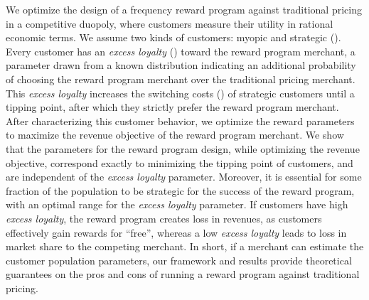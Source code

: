 We optimize the design of a frequency reward program against traditional pricing in a competitive duopoly, where customers measure their utility in rational economic terms.
We assume two kinds of customers: myopic and strategic (\cite{yilmaz2016upgrade}). 
Every customer has an \emph{excess loyalty} (\cite{fader1993excess}) toward the reward program merchant, a parameter drawn from a known distribution indicating an additional probability of choosing the reward program merchant over the traditional pricing merchant.
This \emph{excess loyalty} increases the switching costs (\cite{klemperer1995competition}) of strategic customers until a tipping point, after which they strictly prefer the reward program merchant. 
After characterizing this customer behavior, we optimize the reward parameters to maximize the revenue objective of the reward program merchant.
We show that the parameters for the reward program design, while optimizing the revenue objective, correspond exactly to minimizing the tipping point of customers, and are independent of the \emph{excess loyalty} parameter.
Moreover, it is essential for some fraction of the population to be strategic for the success of the reward program, with an optimal range for the \emph{excess loyalty} parameter. 
If customers have high \emph{excess loyalty}, the reward program creates loss in revenues, as customers effectively gain rewards for ``free'', whereas a low \emph{excess loyalty} leads to loss in market share to the competing merchant.
In short, if a merchant can estimate the customer population parameters, our framework and results provide theoretical guarantees on the pros and cons of running a reward program against traditional pricing.
